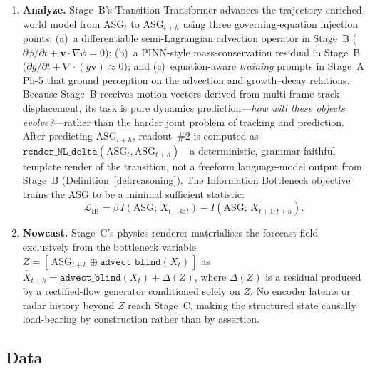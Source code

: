 \documentclass[fleqn,10pt]{wlscirep}
\begin{document}
\begin{enumerate}[leftmargin=*,nosep]
\item \textbf{Analyze.}
Stage~B's Transition Transformer advances the trajectory-enriched world model from $\text{ASG}_t$ to $\text{ASG}_{t+h}$ using three governing-equation injection points:
(a)~a differentiable semi-Lagrangian advection operator in Stage~B ($\partial\phi/\partial t + \mathbf{v}\!\cdot\!\nabla\phi = 0$);
(b)~a PINN-style mass-conservation residual in Stage~B ($\partial g/\partial t + \nabla\!\cdot\!(g\mathbf{v}) \approx 0$);
and (c)~equation-aware \emph{training} prompts in Stage~A Ph-5 that ground perception on the advection and growth--decay relations.
Because Stage~B receives motion vectors derived from multi-frame track displacement, its task is pure dynamics prediction---\emph{how will these objects evolve?}---rather than the harder joint problem of tracking and prediction.
After predicting $\text{ASG}_{t+h}$, readout~\#2 is computed as $\texttt{render\_NL\_delta}(\text{ASG}_t, \text{ASG}_{t+h})$---a deterministic, grammar-faithful template render of the transition, not a freeform language-model output from Stage~B (Definition~\ref{def:reasoning}).
The Information Bottleneck objective trains the ASG to be a minimal sufficient statistic:
\[
\mathcal{L}_\text{IB} = \beta\,I(\text{ASG};\,X_{t-k:t}) - I(\text{ASG};\,X_{t+1:t+n}).
\]

\item \textbf{Nowcast.}
Stage~C's physics renderer materialises the forecast field exclusively from the bottleneck variable
$Z = [\,\text{ASG}_{t+h} \oplus \texttt{advect\_blind}(X_t)\,]$
as $\hat{X}_{t+h} = \texttt{advect\_blind}(X_t) + \Delta(Z)$,
where $\Delta(Z)$ is a residual produced by a rectified-flow generator conditioned solely on $Z$.
No encoder latents or radar history beyond $Z$ reach Stage~C, making the structured state causally load-bearing by construction rather than by assertion.
\end{enumerate}

\subsection*{Data}
\end{document}
